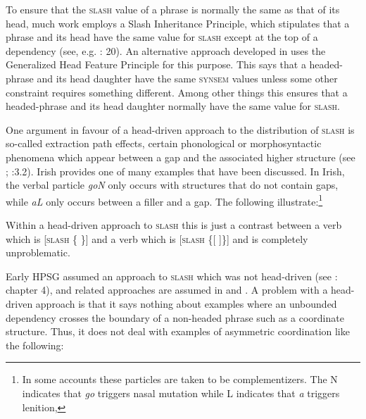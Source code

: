 \documentclass[output=paper
                ,modfonts
                ,nonflat
	        ,collection
	        ,collectionchapter
	        ,collectiontoclongg
 	        ,biblatex
                ,babelshorthands
                ,newtxmath
                ,draftmode
                ,colorlinks, citecolor=brown
]{./langsci/langscibook}
\begin{document}
{To ensure that the \textsc{slash} value of a phrase is normally the same as that
of its head, much work employs a Slash Inheritance Principle, which
stipulates that a phrase and its head have the same value for \textsc{slash}
except at the top of a dependency (see, e.g. \citealt{Bouma:Malouf:Sag:01}:
20). An alternative approach developed in \citet{Ginzburg:Sag:01} uses
the Generalized Head Feature Principle for this purpose. This says that
a headed-phrase and its head daughter have the same \textsc{synsem} values unless
some other constraint requires something different. Among other things
this ensures that a headed-phrase and its head daughter normally have
the same value for \textsc{slash}.

One argument in favour of a head-driven approach to the distribution
of \textsc{slash} is so-called extraction path effects, certain phonological or
morphosyntactic phenomena which appear between a gap and the
associated higher structure (see \citealt{hukari.levine:adjunct};
\citealt{Bouma:Malouf:Sag:01}:3.2). Irish provides one of many
examples that have been discussed. In Irish, the verbal particle
\emph{goN} only occurs with structures that do not contain gaps, while
\emph{aL} only occurs between a filler and a gap. The following
illustrate:\footnote{In some accounts these particles are taken to be
  complementizers. The N indicates that \emph{go} triggers nasal
  mutation while L indicates that \emph{a} triggers lenition,}

\begin{exe} \ex \begin{xlist} \label{ex:UDC:34}

\end{xlist}
\end{exe}

\noindent
Within a head-driven approach to \textsc{slash} this is just a contrast between a
verb which is {[}\textsc{slash} \{ \}{]} and a verb which is {[}\textsc{slash}
\{{[} {]}\}{]} and is completely unproblematic.

Early HPSG assumed an approach to \textsc{slash} which was not
head-driven (see \citealt{Pollard:Sag:94}: chapter 4), and related
approaches are assumed in \citet{Levine:Hukari:06} and \citet{Chaves:12}.  A problem
with a head-driven approach is that it says nothing about examples
where an unbounded dependency crosses the boundary of a non-headed
phrase such as a coordinate structure. Thus, it does not deal with
examples of asymmetric coordination like the following:

}
\end{document}
